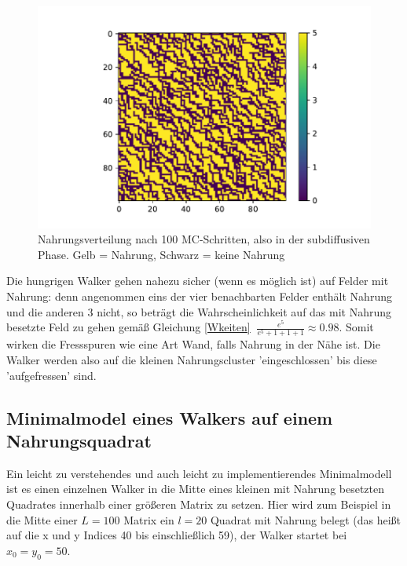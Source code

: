 \documentclass[a4paper, 12pt]{report}
\begin{document}
\begin{figure}[H]
	\centering
	\includegraphics[scale=0.8]{usedmat.pdf}
	\caption{Nahrungsverteilung nach 100 MC-Schritten, also in der subdiffusiven Phase. Gelb = Nahrung, Schwarz = keine Nahrung}
\end{figure}


\noindent Die hungrigen Walker gehen nahezu sicher (wenn es möglich ist) auf Felder mit Nahrung: denn angenommen eins der vier benachbarten Felder enthält Nahrung und die anderen 3 nicht, so beträgt die Wahrscheinlichkeit auf das mit Nahrung besetzte Feld zu gehen gemäß Gleichung \ref{Wkeiten} $\ \frac{e^5}{e^5 + 1+ 1+1} \approx 0.98$. Somit wirken die Fressspuren wie eine Art Wand, falls Nahrung in der Nähe ist. Die Walker werden also auf die kleinen Nahrungscluster 'eingeschlossen' bis diese 'aufgefressen' sind.


\subsection{Minimalmodel eines Walkers auf einem Nahrungsquadrat}\label{minimalmodell}
Ein leicht zu verstehendes und auch leicht zu implementierendes Minimalmodell ist es einen einzelnen Walker in die Mitte eines kleinen mit Nahrung besetzten Quadrates innerhalb einer größeren Matrix zu setzen. Hier wird zum Beispiel in die Mitte einer $L=100$ Matrix ein $l=20$ Quadrat mit Nahrung belegt (das heißt auf die x und y Indices 40 bis einschließlich 59), der Walker startet bei $x_0=y_0=50$.
\end{document}
